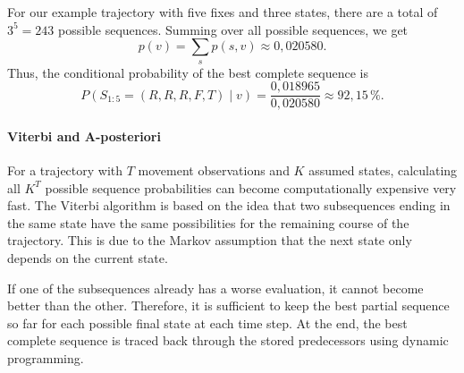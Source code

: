 For our example trajectory with five fixes and three states, there are a total of $3^5=243$ possible sequences.
Summing over all possible sequences, we get
\[
p(v)=\sum_s p(s,v)\approx0{,}020580.
\]
Thus, the conditional probability of the best complete sequence is
\[
P(S_{1:5}=(R,R,R,F,T)\mid v)
=
\frac{0{,}018965}{0{,}020580}
\approx92{,}15\,\%.
\]

\paragraph{Viterbi and A-posteriori}
For a trajectory with $T$ movement observations and $K$ assumed states, calculating all $K^T$ possible sequence probabilities can become computationally expensive very fast.
The Viterbi algorithm is based on the idea that two subsequences ending in the same state have the same possibilities for the remaining course of the trajectory.
This is due to the Markov assumption that the next state only depends on the current state.

If one of the subsequences already has a worse evaluation, it cannot become better than the other.
Therefore, it is sufficient to keep the best partial sequence so far for each possible final state at each time step.
At the end, the best complete sequence is traced back through the stored predecessors using dynamic programming.

